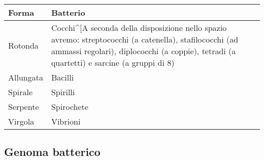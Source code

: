 \documentclass[italian,]{article}
\begin{document}
\begin{longtable}[]{@{}ll@{}}
\toprule
\begin{minipage}[b]{0.47\columnwidth}\raggedright
Forma\strut
\end{minipage} & \begin{minipage}[b]{0.47\columnwidth}\raggedright
Batterio\strut
\end{minipage}\tabularnewline
\midrule
\endhead
\begin{minipage}[t]{0.47\columnwidth}\raggedright
Rotonda\strut
\end{minipage} & \begin{minipage}[t]{0.47\columnwidth}\raggedright
Cocchi\^{}{[}A seconda della disposizione nello spazio avremo:
streptococchi (a catenella), stafilococchi (ad ammassi regolari),
diplococchi (a coppie), tetradi (a quartetti) e sarcine (a gruppi di
8)\strut
\end{minipage}\tabularnewline
\begin{minipage}[t]{0.47\columnwidth}\raggedright
Allungata\strut
\end{minipage} & \begin{minipage}[t]{0.47\columnwidth}\raggedright
Bacilli\strut
\end{minipage}\tabularnewline
\begin{minipage}[t]{0.47\columnwidth}\raggedright
Spirale\strut
\end{minipage} & \begin{minipage}[t]{0.47\columnwidth}\raggedright
Spirilli\strut
\end{minipage}\tabularnewline
\begin{minipage}[t]{0.47\columnwidth}\raggedright
Serpente\strut
\end{minipage} & \begin{minipage}[t]{0.47\columnwidth}\raggedright
Spirochete\strut
\end{minipage}\tabularnewline
\begin{minipage}[t]{0.47\columnwidth}\raggedright
Virgola\strut
\end{minipage} & \begin{minipage}[t]{0.47\columnwidth}\raggedright
Vibrioni\strut
\end{minipage}\tabularnewline
\bottomrule
\end{longtable}

\hypertarget{genoma-batterico}{%
\subsection{Genoma batterico}\label{genoma-batterico}}
\end{document}
